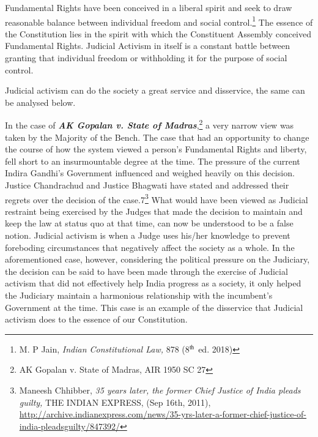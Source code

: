 \begin{multicols}{2}
\vspace{1.2cm}


\noi
Fundamental Rights have been conceived in a liberal spirit and seek to draw reasonable
balance between individual freedom and social control.\footnote{M. P Jain, \textit{Indian Constitutional Law,} 878 (8$^{\rm th}$ ed. 2018)}
 The essence of the Constitution lies in the spirit with which the Constituent Assembly conceived Fundamental Rights. Judicial
Activism in itself is a constant battle between granting that individual freedom or withholding
it for the purpose of social control. 

\noi
Judicial activism can do the society a great service and disservice, the same can be analysed
below.

\noi
In the case of \textbf{\textit{AK Gopalan v. State of Madras}},\footnote{AK Gopalan v. State of Madras, AIR 1950 SC 27}  a very narrow view was taken by the
Majority of the Bench. The case that had an opportunity to change the course of how the
system viewed a person’s Fundamental Rights and liberty, fell short to an insurmountable
degree at the time. The pressure of the current Indira Gandhi’s Government influenced and
weighed heavily on this decision. Justice Chandrachud and Justice Bhagwati have stated and
addressed their regrets over the decision of the case.7\footnote{Maneesh Chhibber, \textit{35 years later, the former Chief Justice of India pleads guilty,} THE INDIAN EXPRESS, (Sep 16th, 2011), \url{http://archive.indianexpress.com/news/35-yrs-later-a-former-chief-justice-of-india-pleadsguilty/847392/}}  What would have been viewed as Judicial restraint being exercised by the Judges that made the decision to maintain and keep
the law at status quo at that time, can now be understood to be a false notion. Judicial
activism is when a Judge uses his/her knowledge to prevent foreboding circumstances that
negatively affect the society as a whole. In the aforementioned case, however, considering the
political pressure on the Judiciary, the decision can be said to have been made through the
exercise of Judicial activism that did not effectively help India progress as a society, it only
helped the Judiciary maintain a harmonious relationship with the incumbent’s Government at
the time. This case is an example of the disservice that Judicial activism does to the essence
of our Constitution.


\end{multicols}
